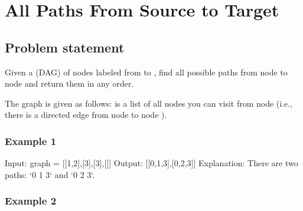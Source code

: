\documentclass[letterpaper,12pt,english]{book}
\begin{document}
\sphinxstepscope


\section{All Paths From Source to Target}
\label{\detokenize{Graph/797_All_Paths_From_Source_to_Target:all-paths-from-source-to-target}}\label{\detokenize{Graph/797_All_Paths_From_Source_to_Target::doc}}

\subsection{Problem statement\sphinxfootnotemark[74]}
\label{\detokenize{Graph/797_All_Paths_From_Source_to_Target:problem-statement}}%
\begin{footnotetext}[74]\sphinxAtStartFootnote
{}
%
\end{footnotetext}\ignorespaces 
\sphinxAtStartPar
Given a  (DAG) of  nodes labeled from  to , find all possible paths from node  to node  and return them in any order.

\sphinxAtStartPar
The graph is given as follows:  is a list of all nodes you can visit from node  (i.e., there is a directed edge from node  to node ).


\subsubsection{Example 1}
\label{\detokenize{Graph/797_All_Paths_From_Source_to_Target:example-1}}
\sphinxAtStartPar
{}

\begin{sphinxVerbatim}[commandchars=\\\{\}]
Input: graph = [[1,2],[3],[3],[]]
Output: [[0,1,3],[0,2,3]]
Explanation: There are two paths: `0 \PYGZhy{}\PYGZgt{} 1 \PYGZhy{}\PYGZgt{} 3` and `0 \PYGZhy{}\PYGZgt{} 2 \PYGZhy{}\PYGZgt{} 3`.
\end{sphinxVerbatim}


\subsubsection{Example 2}
\label{\detokenize{Graph/797_All_Paths_From_Source_to_Target:example-2}}
\sphinxAtStartPar
{}
\end{document}
